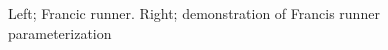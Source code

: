 \begin{figure}[h!]
\begin{minipage}[b]{0.5\linewidth}
 \centering
\end{minipage}
\begin{minipage}[b]{0.5\linewidth}
 \centering
\end{minipage}
\caption{Left; Francic runner. Right; demonstration of Francis runner parameterization}
\label{design-parameterization}
\end{figure}

